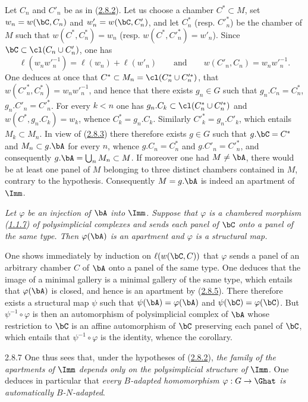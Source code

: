 \documentclass[12pt,a4paper,oneside,english]{smfart}
\makeatletter
\newcommand{\btanchor}[1]{\leavevmode\Hy@raisedlink{\hypertarget{bt:#1}{}}}
\newcommand{\btpageanchor}[1]{\Hy@raisedlink{\hypertarget{p:#1}{}}}
\newcommand{\btref}[1]{\hyperlink{bt:#1}{#1}}
\newcommand{\btpage}[1]{\marginnote{p.~#1}\btpageanchor{#1}}
\newcommand{\pagemark}[1]{\btpage{#1}}
\theoremstyle{definition}
\theoremstyle{bt}
\makeatother
\begin{document}
Let $C_n$ and $C'_n$ be as in (\btref{2.8.2}). Let us choose a chamber
$C^{*}\subset M$, set $w_n=w(\bC,C_n)$ and $w'_n=w(\bC,C'_n)$, and let
$C^{*}_n$ (resp. $C'^{*}_n$) be the chamber of $M$ such that
$w(C^{*},C^{*}_n)=w_n$ (resp. $w(C^{*},C'^{*}_n)=w'_n$). Since
$\bC\subset\cl(C_n\cup C'_n)$, one has
\[
\ell(w_nw'^{-1}_n)=\ell(w_n)+\ell(w'_n)\qquad\text{and}\qquad
w(C'_n,C_n)=w_nw'^{-1}_n.
\]
\pagemark{55}
One deduces at once that $C^{*}\subset M_n=\cl(C^{*}_n\cup C'^{*}_n)$, that
$w(C'^{*}_n,C^{*}_n)=w_nw'^{-1}_n$, and hence that there exists $g_n\in G$
such that $g_n.C_n=C^{*}_n$, $g_n.C'_n=C'^{*}_n$. For every $k<n$ one has
$g_n.C_k\subset\cl(C^{*}_n\cup C'^{*}_n)$ and $w(C^{*},g_n.C_k)=w_k$, whence
$C^{*}_k=g_n.C_k$. Similarly $C'^{*}_k=g_n.C'_k$, which entails
$M_k\subset M_n$. In view of (\btref{2.8.3}) there therefore exists $g\in G$ such that
$g.\bC=C^{*}$ and $M_n\subset g.\bA$ for every $n$, whence $g.C_n=C^{*}_n$ and
$g.C'_n=C'^{*}_n$, and consequently $g.\bA=\bigcup_n M_n\subset M$. If
moreover one had $M\neq\bA$, there would be at least one panel of $M$
belonging to three distinct chambers contained in $M$, contrary to the
hypothesis. Consequently $M=g.\bA$ is indeed an apartment of $\Imm$.

\btanchor{2.8.6}
\emph{Let $\varphi$ be an injection of $\bA$ into $\Imm$. Suppose that
$\varphi$ is a chambered morphism (\btref{1.1.7}) of polysimplicial complexes and
sends each panel of $\bC$ onto a panel of the same type. Then $\varphi(\bA)$
is an apartment and $\varphi$ is a structural map.}

\medskip
One shows immediately by induction on $\ell(w(\bC,C))$ that $\varphi$ sends a
panel of an arbitrary chamber $C$ of $\bA$ onto a panel of the same type. One
deduces that the image of a minimal gallery is a minimal gallery of the same
type, which entails that $\varphi(\bA)$ is closed, and hence is an apartment
by (\btref{2.8.5}). There therefore exists a structural map $\psi$ such that
$\psi(\bA)=\varphi(\bA)$ and $\psi(\bC)=\varphi(\bC)$. But
$\psi^{-1}\circ\varphi$ is then an automorphism of polysimplicial complex of
$\bA$ whose restriction to $\bC$ is an affine automorphism of $\bC$ preserving
each panel of $\bC$, which entails that $\psi^{-1}\circ\varphi$ is the
identity, whence the corollary.

\num{2.8.7}\btanchor{2.8.7}
One thus sees that, under the hypotheses of (\btref{2.8.2}), \emph{the family of the
apartments of $\Imm$ depends only on the polysimplicial structure of $\Imm$}.
One deduces in particular that \emph{every $B$-adapted homomorphism
$\varphi:G\to\Ghat$ is automatically $B$-$N$-adapted}.
\end{document}
